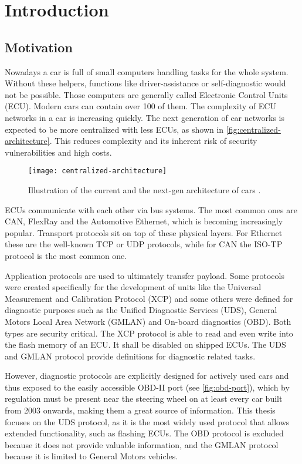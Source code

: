 \section{Introduction}
\label{sec:introduction}

\subsection{Motivation}
Nowadays a car is full of small computers handling tasks for the whole system. Without these helpers, functions like driver-assistance or self-diagnostic would not be possible. Those computers are generally called Electronic Control Units (ECU). Modern cars can contain over 100 of them. The complexity of ECU networks in a car is increasing quickly. The next generation of car networks is expected to be more centralized with less ECUs, as shown in \autoref{fig:centralized-architecture}. This reduces complexity and its inherent risk of security vulnerabilities and high costs.

\begin{figure}[h]
    \centering
    \texttt{[image: centralized-architecture]}
    \caption{Illustration of the current and the next-gen architecture of cars \cite{car-architecture}.}
    \label{fig:centralized-architecture}
\end{figure}

ECUs communicate with each other via bus systems. The most common ones are CAN, FlexRay and the Automotive Ethernet, which is becoming increasingly popular. Transport protocols sit on top of these physical layers. For Ethernet these are the well-known TCP or UDP protocols, while for CAN the ISO-TP protocol is the most common one.

Application protocols are used to ultimately transfer payload. Some protocols were created specifically for the development of units like the Universal Measurement and Calibration Protocol (XCP) and some others were defined for diagnostic purposes such as the Unified Diagnostic Services (UDS), General Motors Local Area Network (GMLAN) and On-board diagnostics (OBD). Both types are security critical. The XCP protocol is able to read and even write into the flash memory of an ECU. It shall be disabled on shipped ECUs. The UDS and GMLAN protocol provide definitions for diagnostic related tasks.

However, diagnostic protocols are explicitly designed for actively used cars and thus exposed to the easily accessible OBD-II port (see \autoref{fig:obd-port}), which by regulation must be present near the steering wheel on at least every car built from 2003 onwards, making them a great source of information. This thesis focuses on the UDS protocol, as it is the most widely used protocol that allows extended functionality, such as flashing ECUs. The OBD protocol is excluded because it does not provide valuable information, and the GMLAN protocol because it is limited to General Motors vehicles.

